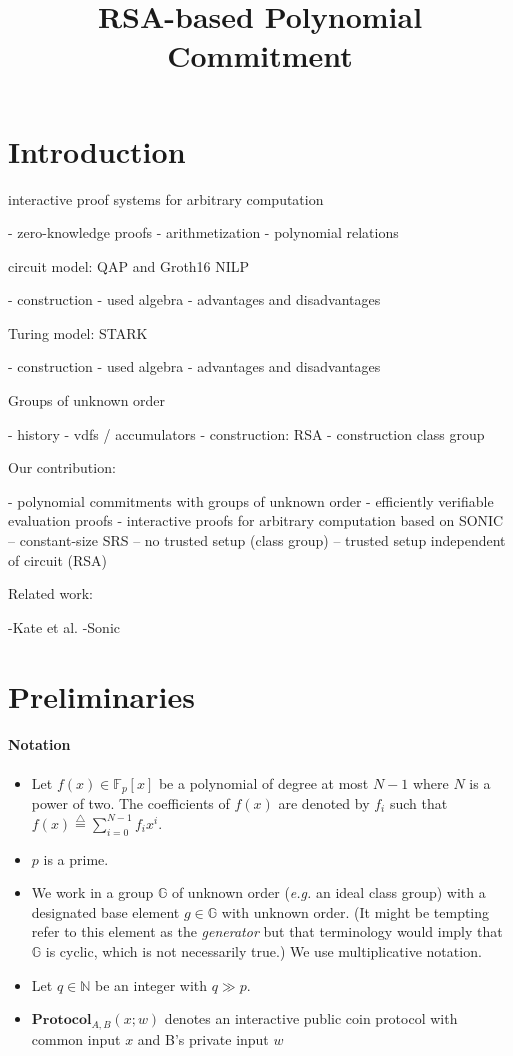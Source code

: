\documentclass{article}
\begin{document}
\title{RSA-based Polynomial Commitment}
\maketitle

\section{Introduction}

interactive proof systems for arbitrary computation

 - zero-knowledge proofs
 - arithmetization
 - polynomial relations
 
circuit model: QAP and Groth16 NILP

 - construction
 - used algebra
 - advantages and disadvantages
 
Turing model: STARK

 - construction
 - used algebra
 - advantages and disadvantages

Groups of unknown order

 - history
 - vdfs / accumulators
 - construction: RSA
 - construction class group

Our contribution:

 - polynomial commitments with groups of unknown order
 - efficiently verifiable evaluation proofs
 - interactive proofs for arbitrary computation based on SONIC
 -- constant-size SRS
 -- no trusted setup (class group)
 -- trusted setup independent of circuit (RSA)

Related work:
	
	-Kate et al.
	-Sonic
\section{Preliminaries}
\paragraph{Notation}
\begin{itemize}
\item Let $f(x) \in \mathbb{F}_p[x]$ be a polynomial of degree at most $N-1$ where $N$ is a power of two. The coefficients of $f(x)$ are denoted by $f_i$ such that $f(x) \stackrel{\triangle}{=} \sum_{i=0}^{N-1} f_i x^i$.
\item $p$ is a prime.
\item We work in a group $\mathbb{G}$ of unknown order (\emph{e.g.} an ideal class group) with a designated base element $g \in \mathbb{G}$ with unknown order. (It might be tempting refer to this element as the \emph{generator} but that terminology would imply that $\mathbb{G}$ is cyclic, which is not necessarily true.) We use multiplicative notation.
\item Let $q \in \mathbb{N}$ be an integer with $q \gg p$.
\item $\textbf{Protocol}_{A,B}(x;w)$ denotes an interactive public coin protocol with common input $x$ and B's private input $w$
\end{itemize}
\end{document}
